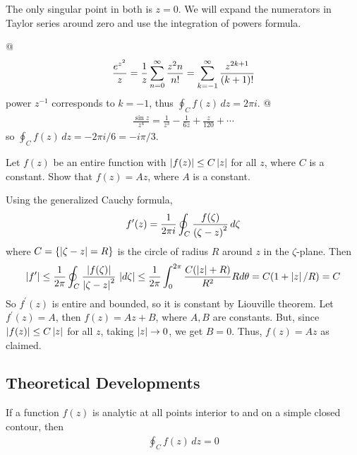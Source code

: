     The only singular point in both is $z=0$. We will expand the numerators
    in Taylor series around zero and use the integration of powers formula.
    \begin{easylist}[itemize]
        @ \begin{align*}
            \frac{e^{z^2}}{z} = \frac{1}{z} \sum_{n=0}^\infty
            \frac{z^2n}{n!} = \sum_{k=-1}^\infty \frac{z^{2k+1}}{{\left( k+1 \right)}!}
        \end{align*}
        power $z^{-1}$ corresponds to $k=-1$, thus $\oint_C f(z) \, dz =
        2\pi i$.
        @ \begin{align*}
            \frac{\sin z}{z^4} = \frac{1}{z^3} - \frac{1}{6z} +
            \frac{z}{120} + \cdots
        \end{align*}
        so $\oint_C f(z) \, dz = -2\pi i / 6 = -i \pi / 3$.
    \end{easylist}

    Let $f(z)$ be an entire function with $\left\lvert f(z) \right\rvert \le C \left\lvert z \right\rvert$ for all
    $z$, where $C$ is a constant. Show that $f(z) = Az$, where $A$ is a
    constant.

    Using the generalized Cauchy formula,
    \begin{align*}
        f^\prime(z) = \frac{1}{2\pi i} \oint_C
        \frac{f(\zeta)}{{\left( \zeta-z \right)}^2} \, d\zeta
    \end{align*}
    where $C=\{\left\lvert \zeta - z \right\rvert = R \}$ is the circle of radius $R$ around
    $z$ in the $\zeta$-plane. Then
    \begin{align*}
        \left\lvert f^\prime \right\rvert \le \frac{1}{2\pi} \oint_C
        \frac{\left\lvert f(\zeta) \right\rvert}{\left\lvert \zeta - z \right\rvert^2} \, \left\lvert d\zeta \right\rvert \le
        \frac{1}{2\pi} \int_0^{2\pi} \frac{C{\left( \left\lvert z \right\rvert + R \right)}}{R^2} R
        d\theta = C{\left( 1+\left\lvert z \right\rvert/R \right)} = C
    \end{align*}
    So $f^\prime(z)$ is entire and bounded, so it is constant by Liouville
    theorem. Let $f^\prime(z) = A$, then $f(z)=Az+B$, where $A, B$ are
    constants. But, since $\left\lvert f(z) \right\rvert \le C\left\lvert z \right\rvert$ for all $z$, taking
    $\left\lvert z \right\rvert\to0$, we get $B=0$. Thus, $f(z) = Az$ as claimed.

    \subsection{Theoretical Developments}
    \begin{thm}
        If a function $f(z)$ is analytic at all points interior  to and on a
        simple closed contour, then
        \begin{align*}
            \oint_C f(z) \, dz = 0
        \end{align*}
    \end{thm}

